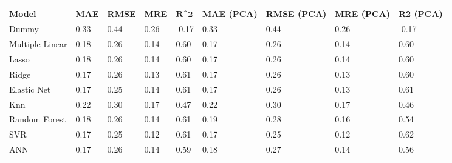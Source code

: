 \begin{table}
\centering
\label{table:iri_reg_pred}
\begin{tabular}{lllllllll}
\toprule
 \textbf{Model} & \textbf{MAE} & \textbf{RMSE} & \textbf{MRE} & $\textbf{R^2}$ & \textbf{MAE (PCA)} & \textbf{RMSE (PCA)} & \textbf{MRE (PCA)} & \textbf{R2 (PCA)} \\
\midrule
          Dummy &         0.33 &          0.44 &         0.26 &          -0.17 &               0.33 &                0.44 &               0.26 &             -0.17 \\
Multiple Linear &         0.18 &          0.26 &         0.14 &           0.60 &               0.17 &                0.26 &               0.14 &              0.60 \\
          Lasso &         0.18 &          0.26 &         0.14 &           0.60 &               0.17 &                0.26 &               0.14 &              0.60 \\
          Ridge &         0.17 &          0.26 &         0.13 &           0.61 &               0.17 &                0.26 &               0.13 &              0.60 \\
    Elastic Net &         0.17 &          0.25 &         0.14 &           0.61 &               0.17 &                0.26 &               0.13 &              0.61 \\
            Knn &         0.22 &          0.30 &         0.17 &           0.47 &               0.22 &                0.30 &               0.17 &              0.46 \\
  Random Forest &         0.18 &          0.26 &         0.14 &           0.61 &               0.19 &                0.28 &               0.16 &              0.54 \\
            SVR &         0.17 &          0.25 &         0.12 &           0.61 &               0.17 &                0.25 &               0.12 &              0.62 \\
            ANN &         0.17 &          0.26 &         0.14 &           0.59 &               0.18 &                0.27 &               0.14 &              0.56 \\
\bottomrule
\end{tabular}
\end{table}

